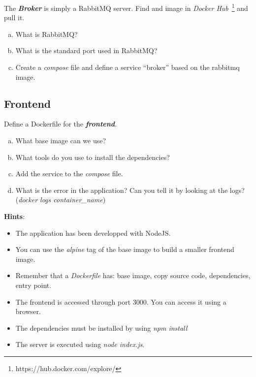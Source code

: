 \documentclass[a4paper,11pt]{exam}
\begin{document}
\begin{questions}
	\question The \textit{\textbf{Broker}} is simply a RabbitMQ server. Find and image in \textit{Docker Hub}~\footnote{https://hub.docker.com/explore/} and pull it.
	\begin{enumerate}[(a)] %
		\item What is RabbitMQ?
		\item What is the standard port used in RabbitMQ?
		\item Create a \textit{compose} file and define a service ``broker'' based on the rabbitmq image.
	\end{enumerate}
\end{questions}
\subsection{Frontend}
\begin{questions}
	\question Define a Dockerfile for the \textit{\textbf{frontend}}.
	\begin{enumerate}[(a)] %
		\item What base image can we use?
		\item What tools do you use to install the dependencies?
		\item Add the service to the \textit{compose} file.
		\item What is the error in the application? Can you tell it by looking at the logs? (\textit{docker logs container\_name})
	\end{enumerate}
	
	\textbf{Hints}:
	\begin{itemize}
		\item The application has been developped with NodeJS.
		\item You can use the \textit{alpine} tag of the base image to build a smaller frontend image.
		\item Remember that a \textit{Dockerfile} has: base image, copy source code, dependencies, entry point.
		\item The frontend is accessed through port 3000. You can access it using a browser.
		\item The dependencies must be installed by using \textit{npm install} 
		\item The server is executed using \textit{node index.js}.
	\end{itemize}
	\end{questions}
\end{document}
